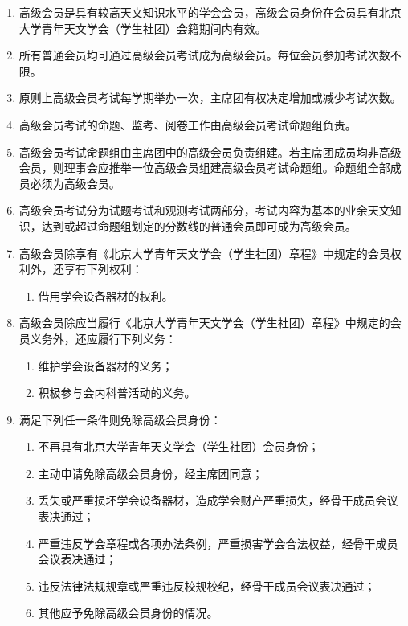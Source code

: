\begin{enumerate}[resume]
    \item 高级会员是具有较高天文知识水平的学会会员，高级会员身份在会员具有北京大学青年天文学会（学生社团）会籍期间内有效。
    
    \item 所有普通会员均可通过高级会员考试成为高级会员。每位会员参加考试次数不限。
    
    \item 原则上高级会员考试每学期举办一次，主席团有权决定增加或减少考试次数。
    
    \item 高级会员考试的命题、监考、阅卷工作由高级会员考试命题组负责。
    
    \item 高级会员考试命题组由主席团中的高级会员负责组建。若主席团成员均非高级会员，则理事会应推举一位高级会员组建高级会员考试命题组。命题组全部成员必须为高级会员。
    
    \item 高级会员考试分为试题考试和观测考试两部分，考试内容为基本的业余天文知识，达到或超过命题组划定的分数线的普通会员即可成为高级会员。
    
    \item 高级会员除享有《北京大学青年天文学会（学生社团）章程》中规定的会员权利外，还享有下列权利：
    \begin{enumerate}
        \item 借用学会设备器材的权利。
    \end{enumerate}

    \item 高级会员除应当履行《北京大学青年天文学会（学生社团）章程》中规定的会员义务外，还应履行下列义务：
    \begin{enumerate}
        \item 维护学会设备器材的义务；
        \item 积极参与会内科普活动的义务。
    \end{enumerate}

    \item 满足下列任一条件则免除高级会员身份：
    \begin{enumerate}
        \item 不再具有北京大学青年天文学会（学生社团）会员身份；
        \item 主动申请免除高级会员身份，经主席团同意；
        \item 丢失或严重损坏学会设备器材，造成学会财产严重损失，经骨干成员会议表决通过；
        \item 严重违反学会章程或各项办法条例，严重损害学会合法权益，经骨干成员会议表决通过；
        \item 违反法律法规规章或严重违反校规校纪，经骨干成员会议表决通过；
        \item 其他应予免除高级会员身份的情况。
    \end{enumerate}
\end{enumerate}

